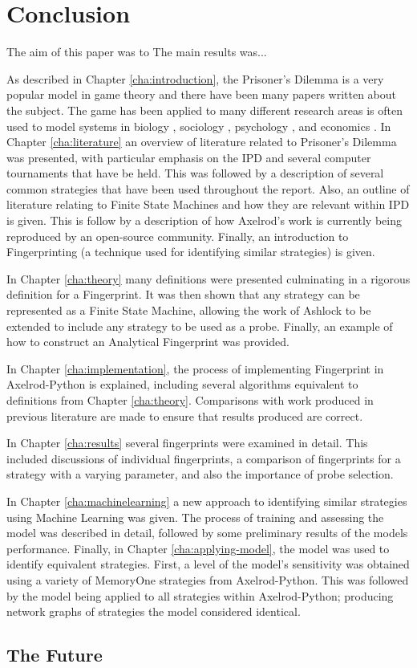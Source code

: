 
\chapter{Conclusion}\label{cha:conclusion}

The aim of this paper was to
The main results was...

As described in Chapter \ref{cha:introduction}, the Prisoner's Dilemma is a very popular model in game theory and there have been many papers written about the subject.
The game has been applied to many different research areas is often used to model systems in biology \cite{Sigmund1999}, sociology \cite{Franken2005}, psychology \cite{Ishibuchi2005}, and economics \cite{Chong2005}.
In Chapter \ref{cha:literature} an overview of literature related to Prisoner's Dilemma was presented, with particular emphasis on the IPD and several computer tournaments that have be held.
This was followed by a description of several common strategies that have been used throughout the report.
Also, an outline of literature relating to Finite State Machines and how they are relevant within IPD is given.
This is follow by a description of how Axelrod's work is currently being reproduced by an open-source community.
Finally, an introduction to Fingerprinting (a technique used for identifying similar strategies) is given.

In Chapter \ref{cha:theory} many definitions were presented culminating in a rigorous definition for a Fingerprint.
It was then shown that any strategy can be represented as a Finite State Machine, allowing the work of Ashlock to be extended to include any strategy to be used as a probe.
Finally, an example of how to construct an Analytical Fingerprint was provided.

In Chapter \ref{cha:implementation}, the process of implementing Fingerprint in Axelrod-Python is explained, including several algorithms equivalent to definitions from Chapter \ref{cha:theory}.
Comparisons with work produced in previous literature are made to ensure that results produced are correct.

In Chapter \ref{cha:results} several fingerprints were examined in detail.
This included discussions of individual fingerprints, a comparison of fingerprints for a strategy with a varying parameter, and also the importance of probe selection.

In Chapter \ref{cha:machinelearning} a new approach to identifying similar strategies using Machine Learning was given.
The process of training and assessing the model was described in detail, followed by some preliminary results of the models performance.
Finally, in Chapter \ref{cha:applying-model}, the model was used to identify equivalent strategies.
First, a level of the model's sensitivity was obtained using a variety of MemoryOne strategies from Axelrod-Python.
This was followed by the model being applied to all strategies within Axelrod-Python; producing network graphs of strategies the model considered identical.

\section{The Future}

